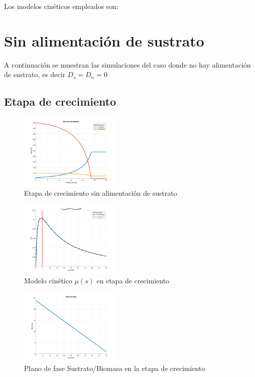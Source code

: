 \documentclass[letterpaper, 10 pt, conference]{ieeeconf}  %
\begin{document}
Los modelos cinéticos empleados son:


\section{Sin alimentación de sustrato}

A continuación se muestran las simulaciones del caso donde no hay alimentación de sustrato, es decir $D_{s}=D_{n}=0$

\subsection{Etapa de crecimiento}

\begin{figure}[H]
  \centering
  \includegraphics[width=0.43\textwidth]{./Images_tp1/D0_crecimiento_completo.png}
  \caption{Etapa de crecimiento sin alimentación de sustrato}
  \label{fig:D0_whole}
\end{figure}

\begin{figure}[H]
  \centering
  \includegraphics[width=0.43\textwidth]{./Images_tp1/D0_mus.png}
  \caption{Modelo cinético $\mu(s)$ en etapa de crecimiento}
  \label{fig:D0_mu}
\end{figure}

\begin{figure}[H]
  \centering
  \includegraphics[width=0.43\textwidth]{./Images_tp1/D0_plano_fase.png}
  \caption{Plano de fase Sustrato/Biomasa en la etapa de crecimiento}
  \label{fig:D0_fase}
\end{figure}
\end{document}
